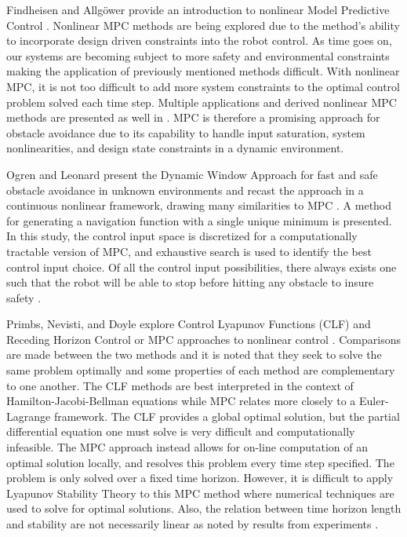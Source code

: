 \documentclass[12pt,onecolumn]{report}
\begin{document}
Findheisen and Allg{\"o}wer provide an introduction to nonlinear Model Predictive Control \cite{Allgower&Findeisen2002}. Nonlinear MPC methods are being explored due to the method's ability to incorporate design driven constraints into the robot control. As time goes on, our systems are becoming subject to more safety and environmental constraints making the application of previously mentioned methods difficult. With nonlinear MPC, it is not too difficult to add more system constraints to the optimal control problem solved each time step. Multiple applications and derived nonlinear MPC methods are presented as well in \cite{Allgower&Findeisen2002}. MPC is therefore a promising approach for obstacle avoidance due to its capability to handle input saturation, system nonlinearities, and design state constraints in a dynamic environment.

Ogren and Leonard present the Dynamic Window Approach for fast and safe obstacle avoidance in unknown environments and recast the approach in a continuous nonlinear framework, drawing many similarities to MPC \cite{Ogren&Leonard2005}. A method for generating a navigation function with a single unique minimum is presented. In this study, the control input space is discretized for a computationally tractable version of MPC, and exhaustive search is used to identify the best control input choice. Of all the control input possibilities, there always exists one such that the robot will be able to stop before hitting any obstacle to insure safety \cite{Ogren&Leonard2005}.

Primbs, Nevisti, and Doyle explore Control Lyapunov Functions (CLF) and Receding Horizon Control or MPC approaches to nonlinear control \cite{Primbs&Nevistic1999}. Comparisons are made between the two methods and it is noted that they seek to solve the same problem optimally and some properties of each method are complementary to one another. The CLF methods are best interpreted in the context of Hamilton-Jacobi-Bellman equations while MPC relates more closely to a Euler-Lagrange framework. The CLF provides a global optimal solution, but the partial differential equation one must solve is very difficult and computationally infeasible. The MPC approach instead allows for on-line computation of an optimal solution locally, and resolves this problem every time step specified. The problem is only solved over a fixed time horizon. However, it is difficult to apply Lyapunov Stability Theory to this MPC method where numerical techniques are used to solve for optimal solutions. Also, the relation between time horizon length and stability are not necessarily linear as noted by results from experiments \cite{Primbs&Nevistic1999}. 
\end{document}
